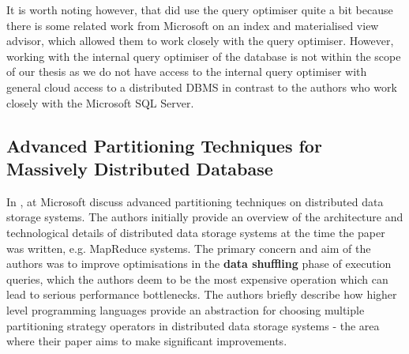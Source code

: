 It is worth noting however, that \citeauthor{DBLP:conf/sigmod/NehmeB11} did use the query optimiser quite a bit because there is some related work from Microsoft on an index and materialised view advisor, which allowed them to work closely with the query optimiser. However, working with the internal query optimiser of the database is not within the scope of our thesis as we do not have access to the internal query optimiser with general cloud access to a distributed DBMS in contrast to the authors who work closely with the Microsoft SQL Server.

\subsection{Advanced Partitioning Techniques for Massively Distributed Database}

In \cite{DBLP:conf/sigmod/ZhouBL12}, \citeauthor{DBLP:conf/sigmod/ZhouBL12} at Microsoft discuss advanced partitioning techniques on distributed data storage systems. The authors initially provide an overview of the architecture and technological details of distributed data storage systems at the time the paper was written, e.g. MapReduce systems. The primary concern and aim of the authors was to improve optimisations in the \textbf{data shuffling} phase of execution queries, which the authors deem to be the most expensive operation which can lead to serious performance bottlenecks. The authors briefly describe how higher level programming languages provide an abstraction for choosing multiple partitioning strategy operators in distributed data storage systems - the area where their paper aims to make significant improvements. 

